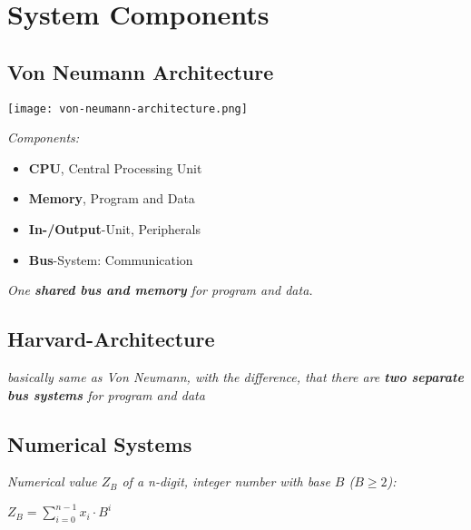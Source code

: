 \section{System Components}

\subsection{Von Neumann Architecture}

\texttt{[image: von-neumann-architecture.png]}

\textit{Components:}

\begin{itemize}
    \item{\textbf{CPU}, Central Processing Unit}
    \item{\textbf{Memory}, Program and Data}
    \item{\textbf{In-/Output}-Unit, Peripherals}
    \item{\textbf{Bus}-System: Communication}
\end{itemize}

\textit{One \textbf{shared bus and memory} for program and data.}

\subsection{Harvard-Architecture}

\textit{
    basically same as Von Neumann, with the difference, that
    there are \textbf{two separate bus systems} for program and data
}

\subsection{Numerical Systems}

\textit{
    Numerical value $Z_B$ of a n-digit, integer number with base $B$ ($B \geq 2$):
}

\begin{center}
    $Z_B = \sum^{n-1}_{i=0} x_i \cdot B^i$
\end{center}

